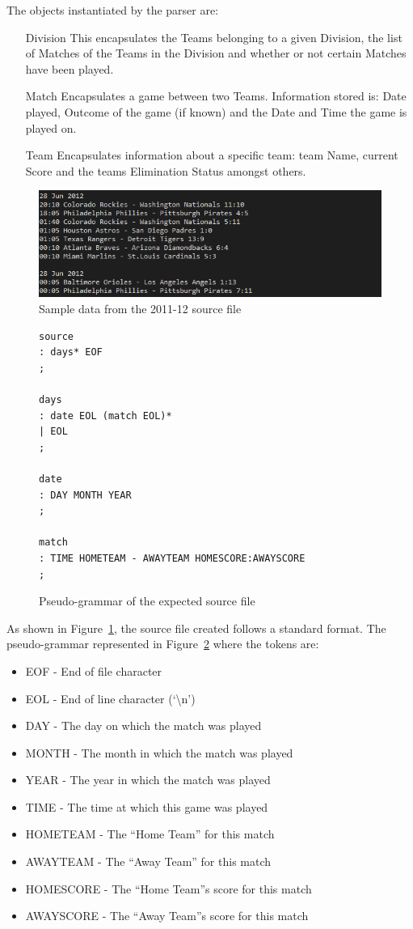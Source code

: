The objects instantiated by the parser are:
\begin{itemize}
  \item[Division] This encapsulates the Teams belonging to a given
    Division, the list of Matches of the Teams in the Division and
    whether or not certain Matches have been played.
  \item[Match] Encapsulates a game between two Teams. Information
    stored is: Date played, Outcome of the game (if known) and the
    Date and Time the game is played on.
  \item[Team] Encapsulates information about a specific team: team
    Name, current Score and the teams Elimination Status amongst
    others.
\end{itemize}
\pagebreak
\begin{figure}[h]
  \includegraphics[width=\linewidth,keepaspectratio]{images/sourceFileExample.png}
  \caption{Sample data from the 2011-12 source file}\label{fig:BASESRC}
\end{figure}
\begin{figure}[h]
\begin{verbatim}
source
: days* EOF
;

days
: date EOL (match EOL)*
| EOL
;

date
: DAY MONTH YEAR
;

match
: TIME HOMETEAM - AWAYTEAM HOMESCORE:AWAYSCORE
;
\end{verbatim}

\caption{Pseudo-grammar of the expected source file}\label{fig:GRAMMAR}
\end{figure}
As shown in Figure~\ref{fig:BASESRC}, the source file created follows
a standard format. The pseudo-grammar represented in
Figure~\ref{fig:GRAMMAR} where the tokens are:
\begin{itemize}
\item EOF -  End of file character
\item EOL - End of line character (`\textbackslash n')
\item DAY - The day on which the match was played
\item MONTH - The month in which the match was played
\item YEAR - The year in which the match was played
\item TIME - The time at which this game was played
\item HOMETEAM - The ``Home Team'' for this match
\item AWAYTEAM - The ``Away Team'' for this match
\item HOMESCORE - The ``Home Team''s score for this match
\item AWAYSCORE - The ``Away Team''s score for this match
\end{itemize}

